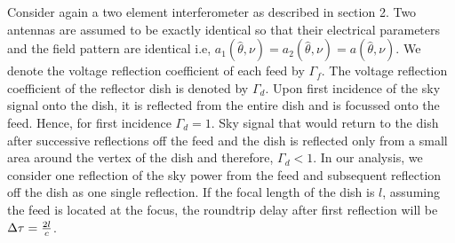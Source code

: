 \documentclass[twocolumn]{emulateapj}
\newcommand{\thhat}{{\hat\theta}}
\begin{document}
Consider again a two element interferometer as described in section 2. Two antennas are assumed to be exactly identical so that their electrical parameters and the field pattern are identical i.e, $a_{1}(\thhat,\nu) = a_{2}(\thhat,\nu) = a(\thhat, \nu)$. We denote the voltage reflection coefficient of each feed by $\Gamma_{f}$. The voltage reflection coefficient of the reflector dish is denoted by $\Gamma_{d}$. Upon first incidence of the sky signal onto the dish, it is reflected from the entire dish and is focussed onto the feed. Hence, for first incidence $\Gamma_{d}=1$. Sky signal that would return to the dish after successive reflections off the feed and the dish is reflected only from a small area around the vertex of the dish and therefore, $\Gamma_{d}<1$. In our analysis, we consider one reflection of the sky power from the feed and subsequent reflection off the dish as one single reflection. If the focal length of the dish is $l$, assuming the feed is located at the focus, the roundtrip delay after first reflection will be $\Delta \tau = {2l \over c}$. 
\end{document}
